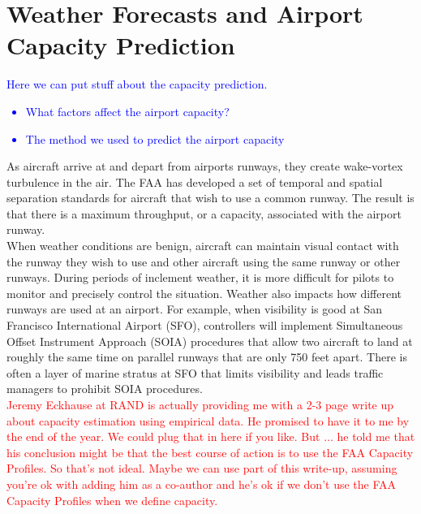 \documentclass[12pt]{article}
\begin{document}
\section{Weather Forecasts and Airport Capacity Prediction}\label{Prediction}
	\textcolor{blue}{Here we can put stuff about the capacity prediction.
	\begin{itemize}
		\item What factors affect the airport capacity?
		\item The method we used to predict the airport capacity
	\end{itemize}
	}
	As aircraft arrive at and depart from airports runways, they create wake-vortex turbulence in the air.  The FAA has developed a set of temporal and spatial separation standards for aircraft that wish to use a common runway.  The result is that there is a maximum throughput, or a capacity, associated with the airport runway.\\
	\newline
	When weather conditions are benign, aircraft can maintain visual contact with the runway they wish to use and other aircraft using the same runway or other runways.  During periods of inclement weather, it is more difficult for pilots to monitor and precisely control the situation.  Weather also impacts how different runways are used at an airport.  For example, when visibility is good at San Francisco International Airport (SFO), controllers will implement Simultaneous Offset Instrument Approach (SOIA) procedures that allow two aircraft to land at roughly the same time on parallel runways that are only 750 feet apart.  There is often a layer of marine stratus at SFO that limits visibility and leads traffic managers to prohibit SOIA procedures.\\
	\newline\textcolor{red}{Jeremy Eckhause at RAND is actually providing me with a 2-3 page write up about capacity estimation using empirical data.  He promised to have it to me by the end of the year.  We could plug that in here if you like.  But $\dots$ he told me that his conclusion might be that the best course of action is to use the FAA Capacity Profiles.  So that's not ideal.  Maybe we can use part of this write-up, assuming you're ok with adding him as a co-author and he's ok if we don't use the FAA Capacity Profiles when we define capacity.}
\end{document}
